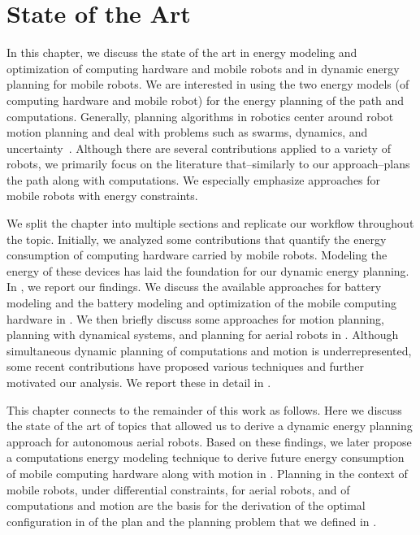 
\chapter{State of the Art}
\label{cp:soa}


In this chapter, we discuss the state of the art in energy modeling and optimization of computing hardware and mobile robots and in dynamic energy planning for mobile robots. We are interested in using the two energy models (of computing hardware and mobile robot) for the energy planning of the path and computations. Generally, planning algorithms in robotics center around robot motion planning and deal with problems such as swarms, dynamics, and uncertainty~\citep{lavalle2006planning}. Although there are several contributions applied to a variety of robots, we primarily focus on the literature that--similarly to our approach--plans the path along with computations. We especially emphasize approaches for mobile robots with energy constraints. 

We split the chapter into multiple sections and replicate our workflow throughout the topic. Initially, we analyzed some contributions that quantify the energy consumption of computing hardware carried by mobile robots. Modeling the energy of these devices has laid the foundation for our dynamic energy planning. In , we report our findings. We discuss the available approaches for battery modeling and the battery modeling and optimization of the mobile computing hardware in . We then briefly discuss some approaches for motion planning, planning with dynamical systems, and planning for aerial robots in . Although simultaneous dynamic planning of computations and motion is underrepresented, some recent contributions have proposed various techniques and further motivated our analysis. We report these in detail in .

This chapter connects to the remainder of this work as follows. Here we discuss the state of the art of topics that allowed us to derive a dynamic energy planning approach for autonomous aerial robots. Based on these findings, we later propose a computations energy modeling technique to derive future energy consumption of mobile computing hardware along with motion in . Planning in the context of mobile robots, under differential constraints, for aerial robots, and of computations and motion are the basis for the derivation of the optimal configuration in  of the plan and the planning problem that we defined in .


